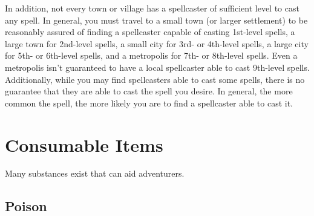         \par In addition, not every town or village has a spellcaster of sufficient level to cast any spell. In general, you must travel to a small town (or larger settlement) to be reasonably assured of finding a spellcaster capable of casting 1st-level spells, a large town for 2nd-level spells, a small city for 3rd- or 4th-level spells, a large city for 5th- or 6th-level spells, and a metropolis for 7th- or 8th-level spells. Even a metropolis isn't guaranteed to have a local spellcaster able to cast 9th-level spells. Additionally, while you may find spellcasters able to cast some spells, there is no guarantee that they are able to cast the spell you desire. In general, the more common the spell, the more likely you are to find a spellcaster able to cast it.

\section{Consumable Items}\label{Consumable Items}

    Many substances exist that can aid adventurers.

    \subsection{Poison}\label{Poison}

